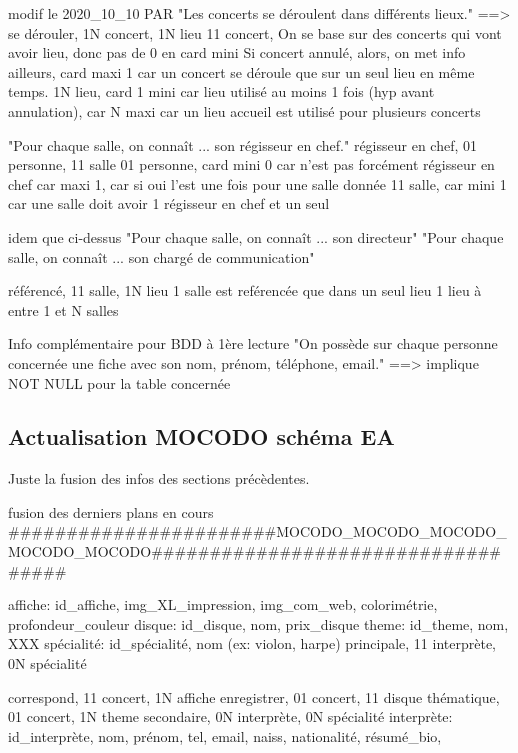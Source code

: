 \documentclass[12pt,a4paper]{article}
\begin{document}
{modif le 2020_10_10 PAR 
"Les concerts se déroulent dans différents lieux."
==> se dérouler, 1N concert, 1N lieu
11 concert, On se base sur des concerts qui vont avoir lieu, donc pas de 0 en card mini
Si concert annulé, alors, on met info ailleurs, card maxi 1 car un concert se déroule que 
sur un seul lieu en même temps.
1N lieu, card 1 mini car lieu utilisé au moins 1 fois (hyp avant annulation),
car N maxi car un lieu accueil est utilisé pour plusieurs concerts 



"Pour chaque salle, on connaît ... son régisseur en chef."
régisseur en chef, 01 personne, 11 salle
01 personne, card mini 0 car n'est pas forcément régisseur en chef
car maxi 1, car si oui l'est une fois pour une salle donnée
11 salle, car mini 1 car une salle doit avoir 1 régisseur en chef et un seul

idem que ci-dessus
"Pour chaque salle, on connaît ... son directeur"
"Pour chaque salle, on connaît ... son chargé de communication"



référencé, 11 salle, 1N lieu
1 salle est reférencée que dans un seul lieu
1 lieu à entre 1 et N salles



Info complémentaire pour BDD à 1ère lecture
"On possède sur chaque personne concernée une fiche avec son nom, prénom, téléphone, email."
==> implique NOT NULL pour la table concernée





\subsection{Actualisation MOCODO schéma EA}
Juste la fusion des infos des sections précèdentes.

fusion des derniers plans en cours
#######################MOCODO_MOCODO_MOCODO_MOCODO_MOCODO###################################

affiche: id_affiche, img_XL_impression, img_com_web, colorimétrie, profondeur_couleur
disque: id_disque, nom, prix_disque
theme: id_theme, nom, XXX
spécialité: id_spécialité, nom (ex: violon, harpe)
principale, 11 interprète, 0N spécialité

correspond, 11 concert, 1N affiche
enregistrer, 01 concert, 11 disque
thématique, 01 concert, 1N theme
secondaire, 0N interprète, 0N spécialité
interprète: id_interprète, nom, prénom, tel, email, naiss, nationalité, résumé_bio,

}
\end{document}
